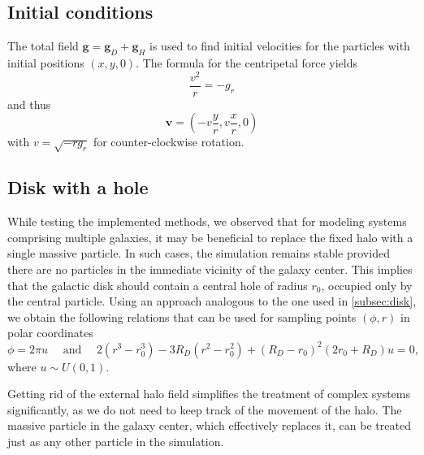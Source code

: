 \subsection{Initial conditions}
The total field $\mathbf{g} = \mathbf{g}_D + \mathbf{g}_H$ is used to find initial velocities for the particles with initial positions $(x, y, 0)$.
The formula for the centripetal force yields
\begin{equation*}
    \frac{v^2}{r} = -g_r
\end{equation*}
and thus
\begin{equation*}
    \mathbf{v} = \left(-v \frac{y}{r}, v\frac{x}{r}, 0\right)
\end{equation*}
with $v = \sqrt{- r g_r}$
for counter-clockwise rotation.

\subsection{Disk with a hole}\label{subsec:disk-with-hole}
While testing the implemented methods, we observed that for modeling systems comprising multiple galaxies, it may be beneficial to replace the fixed halo with a single massive particle.
In such cases, the simulation remains stable provided there are no particles in the immediate vicinity of the galaxy center.
This implies that the galactic disk should contain a central hole of radius $r_0$, occupied only by the central particle.
Using an approach analogous to the one used in \autoref{subsec:disk}, we obtain the following relations that can be used for sampling points $(\phi, r)$ in polar coordinates
\begin{equation*}
    \phi = 2\pi u \quad \text{ and } \quad 2(r^3 - r_0^3)-3R_D(r^2 - r_0^2) + (R_D-r_0)^2(2r_0 + R_D)u = 0,
\end{equation*}
where $u \sim U(0, 1)$.

Getting rid of the external halo field simplifies the treatment of complex systems significantly, as we do not need to keep track of the movement of the halo.
The massive particle in the galaxy center, which effectively replaces it, can be treated just as any other particle in the simulation.